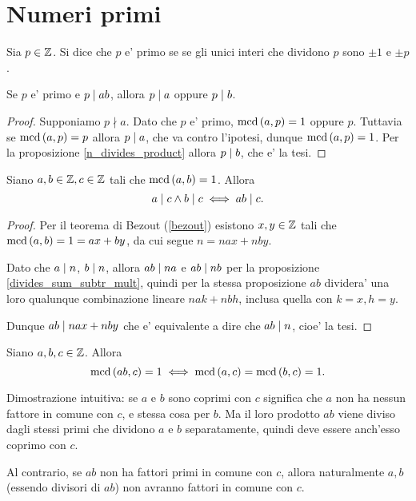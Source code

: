 \section{Numeri primi}

\begin{definition}
    Sia $p \in \mathbb{Z}$. Si dice che $p$ e' primo se se gli unici interi che dividono $p$ sono
    $\pm 1$ e $\pm p$.
\end{definition}

\begin{proposition}\label{primo_divide_prodotto}
    Se $p$ e' primo e $p \mid ab$, allora $p \mid a$ oppure $p \mid b$.
\end{proposition}
\begin{proof}
    Supponiamo $p \nmid a$. Dato che $p$ e' primo, $\operatorname{mcd}\left(a, p\right) = 1$ oppure $p$.
    Tuttavia se $\operatorname{mcd}\left(a, p\right) = p$ allora $p \mid a$, che va contro l'ipotesi, dunque 
    $\operatorname{mcd}\left(a, p\right) = 1$. Per la proposizione \ref{n_divides_product} allora $p \mid b$, che e' la tesi.
\end{proof}

\begin{proposition} \label{prodotto_numeri_coprimi}
    Siano $a, b \in \mathbb{Z}, c \in \mathbb{Z}$ tali che $\operatorname{mcd}\left(a, b\right) = 1$. Allora
    \begin{equation}
        a \mid c \land b \mid c \iff ab \mid c.
    \end{equation}
\end{proposition}
\begin{proof}
    Per il teorema di Bezout (\ref{bezout}) esistono $x, y \in \mathbb{Z}$ tali che $\operatorname{mcd}\left(a, b\right) = 1 = ax+by$, da cui segue $n = nax + nby$.

    Dato che $a \mid n$, $b \mid n$, allora $ab \mid na$ e $ab \mid nb$ per la proposizione \ref{divides_sum_subtr_mult}, quindi per la stessa proposizione $ab$ dividera' una loro qualunque combinazione lineare $nak + nbh$, inclusa quella con $k = x, h = y$.

    Dunque $ab \mid nax + nby$ che e' equivalente a dire che $ab \mid n$, cioe' la tesi.
\end{proof}


\begin{proposition} \label{prodotto_coprimo_2}
    Siano $a, b, c \in \mathbb{Z}$. Allora
    \begin{equation}
        \operatorname{mcd}\left(ab, c\right) = 1 \iff \operatorname{mcd}\left(a, c\right) = \operatorname{mcd}\left(b, c\right) = 1.
    \end{equation}
\end{proposition}
\begin{intuition}
    Dimostrazione intuitiva: se $a$ e $b$ sono coprimi con $c$ significa che $a$ non ha nessun fattore in comune con $c$, e stessa cosa per $b$. Ma il loro prodotto $ab$ viene diviso dagli stessi primi che dividono $a$ e $b$ separatamente, quindi deve essere anch'esso coprimo con $c$.

    Al contrario, se $ab$ non ha fattori primi in comune con $c$, allora naturalmente $a, b$ (essendo divisori di $ab$) non avranno fattori in comune con $c$.
\end{intuition}

